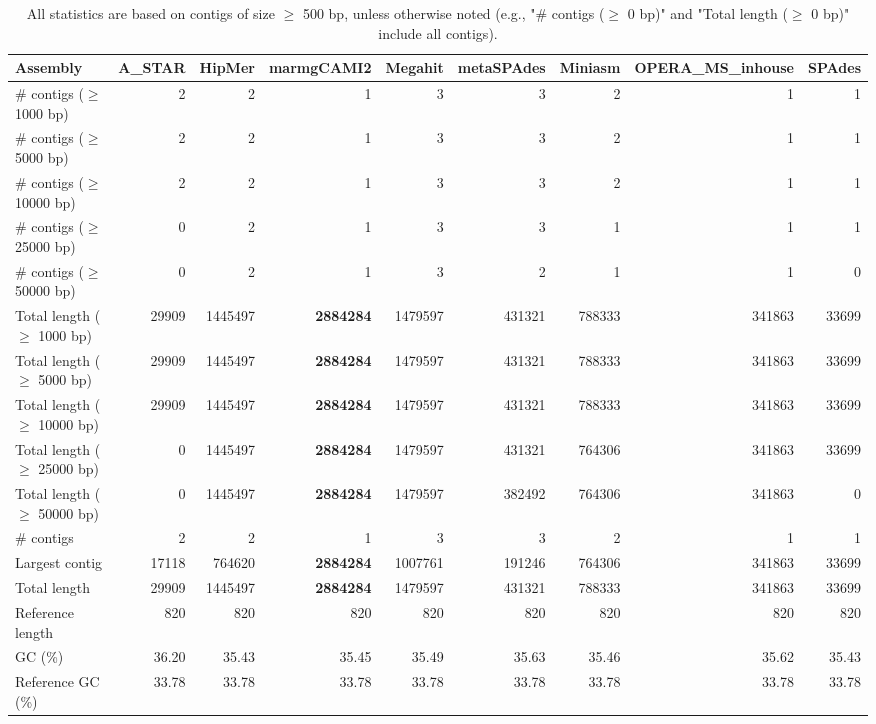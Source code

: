 \documentclass[12pt,a4paper]{article}
\begin{document}
\begin{table}[ht]
\begin{center}
\caption{All statistics are based on contigs of size $\geq$ 500 bp, unless otherwise noted (e.g., "\# contigs ($\geq$ 0 bp)" and "Total length ($\geq$ 0 bp)" include all contigs).}
\begin{tabular}{|l*{8}{|r}|}
\hline
Assembly & A\_STAR & HipMer & marmgCAMI2 & Megahit & metaSPAdes & Miniasm & OPERA\_MS\_inhouse & SPAdes \\ \hline
\# contigs ($\geq$ 1000 bp) & 2 & 2 & 1 & 3 & 3 & 2 & 1 & 1 \\ \hline
\# contigs ($\geq$ 5000 bp) & 2 & 2 & 1 & 3 & 3 & 2 & 1 & 1 \\ \hline
\# contigs ($\geq$ 10000 bp) & 2 & 2 & 1 & 3 & 3 & 2 & 1 & 1 \\ \hline
\# contigs ($\geq$ 25000 bp) & 0 & 2 & 1 & 3 & 3 & 1 & 1 & 1 \\ \hline
\# contigs ($\geq$ 50000 bp) & 0 & 2 & 1 & 3 & 2 & 1 & 1 & 0 \\ \hline
Total length ($\geq$ 1000 bp) & 29909 & 1445497 & {\bf 2884284} & 1479597 & 431321 & 788333 & 341863 & 33699 \\ \hline
Total length ($\geq$ 5000 bp) & 29909 & 1445497 & {\bf 2884284} & 1479597 & 431321 & 788333 & 341863 & 33699 \\ \hline
Total length ($\geq$ 10000 bp) & 29909 & 1445497 & {\bf 2884284} & 1479597 & 431321 & 788333 & 341863 & 33699 \\ \hline
Total length ($\geq$ 25000 bp) & 0 & 1445497 & {\bf 2884284} & 1479597 & 431321 & 764306 & 341863 & 33699 \\ \hline
Total length ($\geq$ 50000 bp) & 0 & 1445497 & {\bf 2884284} & 1479597 & 382492 & 764306 & 341863 & 0 \\ \hline
\# contigs & 2 & 2 & 1 & 3 & 3 & 2 & 1 & 1 \\ \hline
Largest contig & 17118 & 764620 & {\bf 2884284} & 1007761 & 191246 & 764306 & 341863 & 33699 \\ \hline
Total length & 29909 & 1445497 & {\bf 2884284} & 1479597 & 431321 & 788333 & 341863 & 33699 \\ \hline
Reference length & 820 & 820 & 820 & 820 & 820 & 820 & 820 & 820 \\ \hline
GC (\%) & 36.20 & 35.43 & 35.45 & 35.49 & 35.63 & 35.46 & 35.62 & 35.43 \\ \hline
Reference GC (\%) & 33.78 & 33.78 & 33.78 & 33.78 & 33.78 & 33.78 & 33.78 & 33.78 \\ \hline

\end{tabular}
\end{center}
\end{table}
\end{document}
